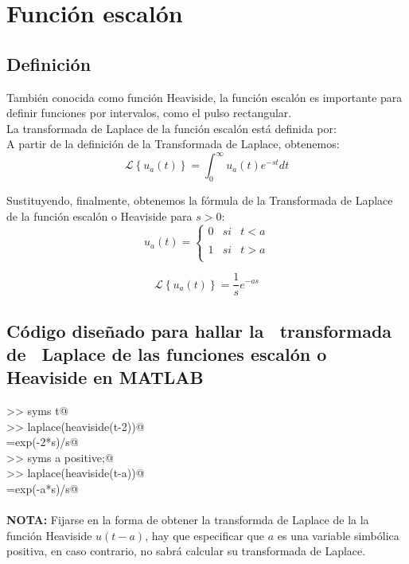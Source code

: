 \documentclass[12pt,a4paper,twoside,onecolumn,openany]{book}
\begin{document}
\chapter{Función escalón}
\section{Definición}
También conocida como función Heaviside, la función escalón es importante para definir funciones por intervalos, como el pulso rectangular. 
\\
La transformada de Laplace de la función escalón está definida por:
\\
A partir de la definición de la Transformada de Laplace, obtenemos: 
\[
\mathcal { L } \left\lbrace {{u _{a} ( t )  }}\right\rbrace=\int_ { 0 } ^ { \infty } u _{a} ( t ) e^{-st} dt
\]

Sustituyendo, finalmente, obtenemos la fórmula de la Transformada de Laplace de la función escalón o Heaviside para $s>0$:
\[
u_{a}(t)= \left\{ \begin{array}{lcc}
             0 &   si  & t < a \\
             \\ 1 &  si & t > a \\
             \end{array}
   \right.
 \]

\[
\mathcal { L } \left\lbrace {{u _{a} ( t )  }}\right\rbrace=\frac{1}{s} e^{-as}
\]
\newpage 
\section{Código diseñado para hallar la ~\mbox{transformada} de ~\mbox{Laplace} de las funciones escalón o Heaviside en MATLAB}
\verb@>> syms t@
\\
\verb@>> laplace(heaviside(t-2))@
\\
\verb@ans =exp(-2*s)/s@
\\
\verb@>> syms a positive;@
\\
\verb@>> laplace(heaviside(t-a))@
\\
\verb@ans =exp(-a*s)/s@
\\\\

\textbf{NOTA:} Fijarse en la forma de obtener la transformda de Laplace de la la función Heaviside $u(t-a)$, hay que especificar que $a$ es una variable simbólica positiva, en caso contrario, no sabrá calcular su transformada de Laplace.
\end{document}

